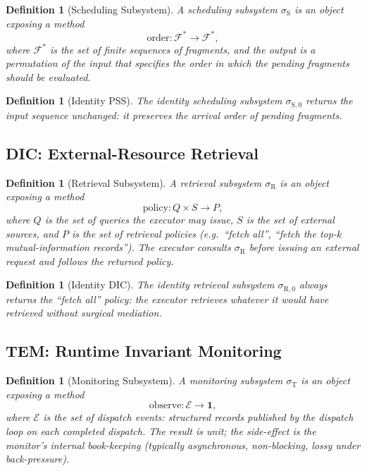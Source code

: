 \documentclass[twocolumn,11pt,a4paper]{article}
\newtheorem{definition}[theorem]{Definition}
\newcommand{\Sub}{\sigma}
\newcommand{\Evt}{\mathcal{E}}
\newcommand{\Pss}{\Sub_{\mathrm{S}}}
\newcommand{\Dic}{\Sub_{\mathrm{R}}}
\newcommand{\Tem}{\Sub_{\mathrm{T}}}
\begin{document}
\begin{definition}[Scheduling Subsystem]
\label{def:pss}
A \emph{scheduling subsystem} $\Pss$ is an object exposing a method
\[
\text{order} : \mathcal{F}^* \to \mathcal{F}^*,
\]
where $\mathcal{F}^*$ is the set of finite sequences of fragments, and the output is a permutation of the input that specifies the order in which the pending fragments should be evaluated.
\end{definition}

\begin{definition}[Identity PSS]
\label{def:noop-pss}
The \emph{identity scheduling subsystem} $\sigma_{\mathrm{S},0}$ returns the input sequence unchanged: it preserves the arrival order of pending fragments.
\end{definition}

\subsection{DIC: External-Resource Retrieval}

\begin{definition}[Retrieval Subsystem]
\label{def:dic}
A \emph{retrieval subsystem} $\Dic$ is an object exposing a method
\[
\text{policy} : Q \times S \to P,
\]
where $Q$ is the set of queries the executor may issue, $S$ is the set of external sources, and $P$ is the set of retrieval policies (e.g.\ ``fetch all'', ``fetch the top-$k$ mutual-information records''). The executor consults $\Dic$ before issuing an external request and follows the returned policy.
\end{definition}

\begin{definition}[Identity DIC]
\label{def:noop-dic}
The \emph{identity retrieval subsystem} $\sigma_{\mathrm{R},0}$ always returns the ``fetch all'' policy: the executor retrieves whatever it would have retrieved without surgical mediation.
\end{definition}

\subsection{TEM: Runtime Invariant Monitoring}

\begin{definition}[Monitoring Subsystem]
\label{def:tem}
A \emph{monitoring subsystem} $\Tem$ is an object exposing a method
\[
\text{observe} : \Evt \to \mathbf{1},
\]
where $\Evt$ is the set of \emph{dispatch events}: structured records published by the dispatch loop on each completed dispatch. The result is unit; the side-effect is the monitor's internal book-keeping (typically asynchronous, non-blocking, lossy under back-pressure).
\end{definition}
\end{document}
